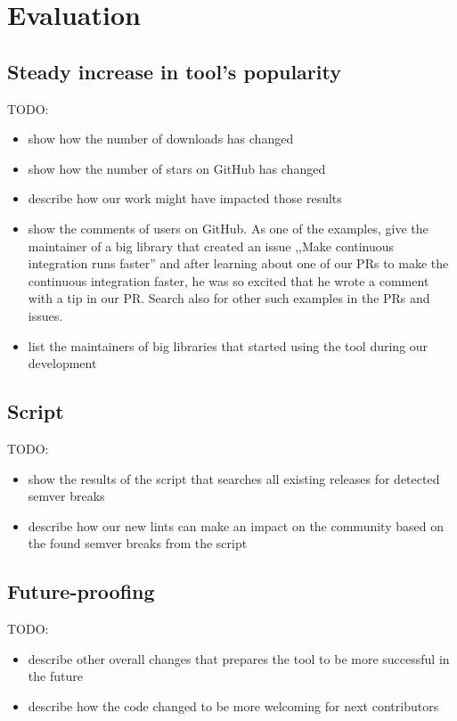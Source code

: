 \documentclass[licencjacka,en]{pracamgr}
\begin{document}
\chapter{Evaluation}\label{r:chapter_evaluation}

\section{Steady increase in tool's popularity}

TODO:
\begin{itemize}
	\item show how the number of downloads has changed
	\item show how the number of stars on GitHub has changed
	\item describe how our work might have impacted those results
	\item show the comments of users on GitHub.
		As one of the examples, give the maintainer of a big
		library that created an issue ,,Make continuous integration runs faster''
		and after learning about one of our PRs to make the continuous integration faster,
		he was so excited that he wrote a comment with a tip in our PR.
		Search also for other such examples in the PRs and issues.
	\item list the maintainers of big libraries that started using the tool during our development
\end{itemize}

\section{Script}

TODO:
\begin{itemize}
	\item show the results of the script that searches all existing releases for detected semver breaks
	\item describe how our new lints can make an impact on the community based on the found semver breaks from the script
\end{itemize}

\section{Future-proofing}

TODO:
\begin{itemize}
	\item describe other overall changes that prepares the tool to be more successful in the future
	\item describe how the code changed to be more welcoming for next contributors
\end{itemize}
\end{document}
